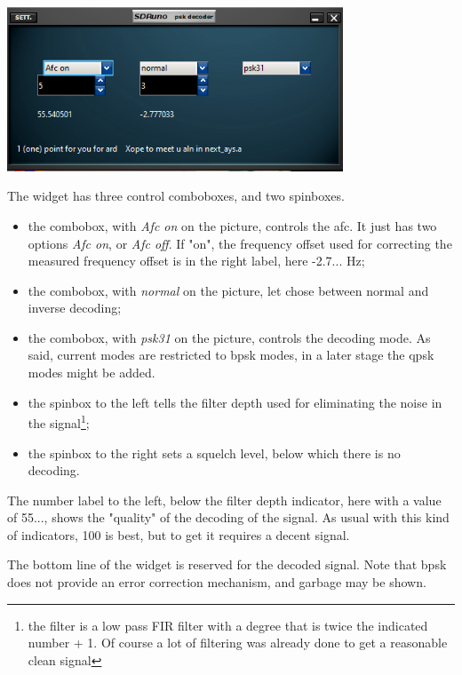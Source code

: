 \documentclass[11pt]{article}
\begin{document}
\includegraphics[width=100mm]{psk-plugin-widget.png}

The widget has three control comboboxes, and two spinboxes.

\begin{itemize}
\item the combobox, with {\em Afc on} on the picture, controls the afc. 
It just has two options {\em Afc on}, or {\em Afc off}. If "on", the
frequency offset used for correcting the measured frequency offset is
in the right label, here -2.7... Hz;
\item the combobox, with {\em normal} on the picture, let chose between
normal and inverse decoding;
\item the combobox, with {\em psk31} on the picture, controls the decoding mode.
As said, current modes are restricted to bpsk modes, in a later stage
the qpsk modes might be added.
\item the spinbox to the left tells the filter depth used for eliminating
the noise in the signal\footnote{the filter is a low pass FIR filter with
a degree that is twice the indicated number + 1. Of course a lot of filtering
was already done to get a reasonable clean signal};
\item the spinbox to the right sets a squelch level, below which there
is no decoding.
\end{itemize}

The number label to the left, below the filter depth indicator,
here with a value of 55...,
shows the "quality" of the decoding of the signal. As usual
with this kind of indicators, 100 is best, but to get it requires
a decent signal.

The bottom line of the widget is reserved for the decoded signal. Note that
bpsk does not provide an error correction mechanism, and garbage may be shown.
\end{document}
